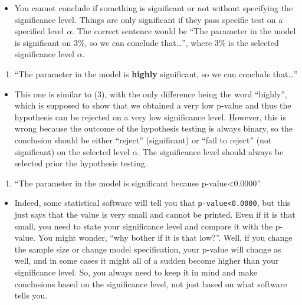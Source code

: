 \documentclass[
]{book}
\providecommand{\tightlist}{%
  \setlength{\itemsep}{0pt}\setlength{\parskip}{0pt}}
\theoremstyle{definition}
\theoremstyle{definition}
\theoremstyle{definition}
\theoremstyle{definition}
\theoremstyle{remark}
\begin{document}
\begin{itemize}
\tightlist
\item
  You cannot conclude if something is significant or not without specifying the significance level. Things are only significant if they pass specific test on a specified level \(\alpha\). The correct sentence would be ``The parameter in the model is significant on 3\%, so we can conclude that\ldots{}'', where 3\% is the selected significance level \(\alpha\).
\end{itemize}

\begin{enumerate}
\def\labelenumi{\arabic{enumi}.}
\setcounter{enumi}{3}
\tightlist
\item
  ``The parameter in the model is \textbf{highly} significant, so we can conclude that\ldots{}''
\end{enumerate}

\begin{itemize}
\tightlist
\item
  This one is similar to (3), with the only difference being the word ``highly'', which is supposed to show that we obtained a very low p-value and thus the hypothesis can be rejected on a very low significance level. However, this is wrong because the outcome of the hypothesis testing is always binary, so the conclusion should be either ``reject'' (significant) or ``fail to reject'' (not significant) on the selected level \(\alpha\). The significance level should always be selected prior the hypothesis testing.
\end{itemize}

\begin{enumerate}
\def\labelenumi{\arabic{enumi}.}
\setcounter{enumi}{4}
\tightlist
\item
  ``The parameter in the model is significant because p-value\textless0.0000''
\end{enumerate}

\begin{itemize}
\tightlist
\item
  Indeed, some statistical software will tell you that \texttt{p-value\textless{}0.0000}, but this just says that the value is very small and cannot be printed. Even if it is that small, you need to state your significance level and compare it with the p-value. You might wonder, ``why bother if it is that low?''. Well, if you change the sample size or change model specification, your p-value will change as well, and in some cases it might all of a sudden become higher than your significance level. So, you always need to keep it in mind and make conclusions based on the significance level, not just based on what software tells you.
\end{itemize}
\end{document}
